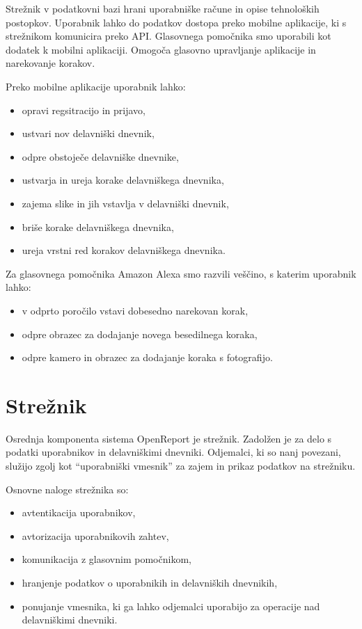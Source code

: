 \documentclass[a4paper, 12pt]{book}
\begin{document}
Strežnik v podatkovni bazi hrani uporabniške račune in opise tehnoloških postopkov.
Uporabnik lahko do podatkov dostopa preko mobilne aplikacije, ki s strežnikom komunicira preko API.
Glasovnega pomočnika smo uporabili kot dodatek k mobilni aplikaciji.
Omogoča glasovno upravljanje aplikacije in narekovanje korakov.

\bigbreak
Preko mobilne aplikacije uporabnik lahko:
\begin{itemize}
	\item opravi regsitracijo in prijavo,
	\item ustvari nov delavniški dnevnik,
	\item odpre obstoječe delavniške dnevnike,
	\item ustvarja in ureja korake delavniškega dnevnika,
	\item zajema slike in jih vstavlja v delavniški dnevnik,
	\item briše korake delavniškega dnevnika,
	\item ureja vrstni red korakov delavniškega dnevnika.
\end{itemize}

Za glasovnega pomočnika Amazon Alexa smo razvili veščino, s katerim uporabnik lahko:

\begin{itemize}
	\item v odprto poročilo vstavi dobesedno narekovan korak,
	\item odpre obrazec za dodajanje novega besedilnega koraka,
	\item odpre kamero in obrazec za dodajanje koraka s fotografijo.
\end{itemize}



\section{Strežnik}

Osrednja komponenta sistema OpenReport je strežnik.
Zadolžen je za delo s podatki uporabnikov in delavniškimi dnevniki.
Odjemalci, ki so nanj povezani, služijo zgolj kot \enquote{uporabniški vmesnik} za zajem in prikaz podatkov na strežniku.


\noindent Osnovne naloge strežnika so:
\begin{itemize}
	\item avtentikacija uporabnikov,
	\item avtorizacija uporabnikovih zahtev,
	\item komunikacija z glasovnim pomočnikom,
	\item hranjenje podatkov o uporabnikih in delavniških dnevnikih, 
	\item ponujanje vmesnika, ki ga lahko odjemalci uporabijo za operacije nad delavniškimi dnevniki.
\end{itemize}
\end{document}
